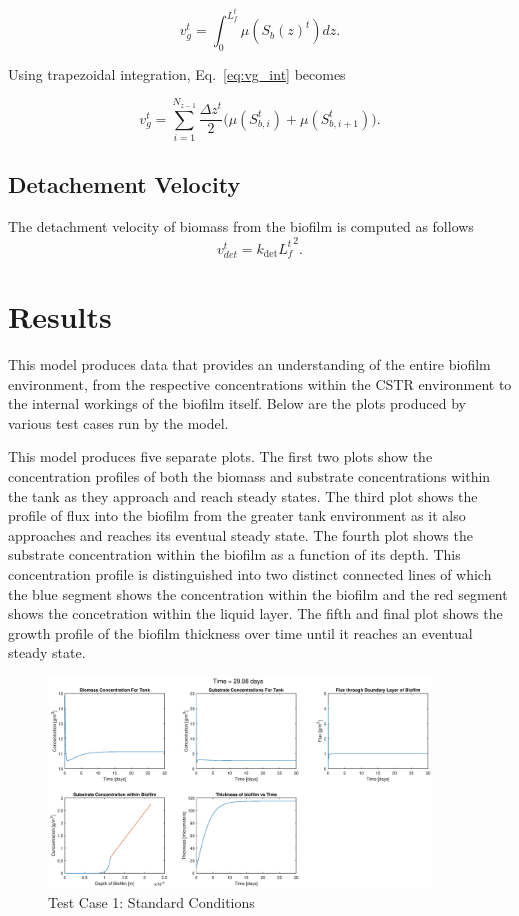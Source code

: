 \documentclass[letterpaper, twoside]{article}
\numberwithin{equation}{section}
\begin{document}
\begin{equation}
  \label{eq:vg_int}
  {v_g^{t}}={\int_{0}^{L_f^{t}}\mu(S_b(z)^{t})dz}.
\end{equation}

Using trapezoidal integration, Eq.~\ref{eq:vg_int} becomes

\begin{equation}
  \label{eq:vg_sum}
  {v_g^{t}}={\sum_{i=1}^{N_{z-1}}  {\frac{\Delta {z^{t}}}{2}}  ( {\mu({S_{b,i}^{t}})+\mu({S_{b,i+1}^{t}})}}).
\end{equation}

\subsection{Detachement Velocity}
The detachment velocity of biomass from the biofilm is computed as follows
\begin{equation}
  \label{eq:vdet2}
  {v_{det}^{t}}={k_{\mathrm{det}}{L^t_f}^2}.
\end{equation}

\section{Results}
This model produces data that provides an understanding of the entire biofilm environment, from the respective concentrations within the CSTR environment to the internal workings of the biofilm itself. Below are the plots produced by various test cases run by the model.

This model produces five separate plots. The first two plots show the concentration profiles of both the biomass and substrate concentrations within the tank as they approach and reach steady states. The third plot shows the profile of flux into the biofilm from the greater tank environment as it also approaches and reaches its eventual steady state. The fourth plot shows the substrate concentration within the biofilm as a function of its depth. This concentration profile is distinguished into two distinct connected lines of which the blue segment shows the concentration within the biofilm and the red segment shows the concetration within the liquid layer. The fifth and final plot shows the growth profile of the biofilm thickness over time until it reaches an eventual steady state.

\begin{figure}[H]
  \centering
  \includegraphics[read=eps, width=4in]{Testcase1_figure.eps}
  \caption{Test Case 1: Standard Conditions}
\end{figure}
\end{document}
